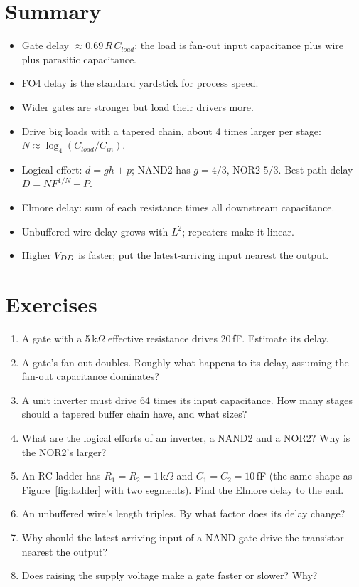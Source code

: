 \section{Summary}

\begin{itemize}
  \item Gate delay $\approx 0.69\,R\,C_{load}$; the load is fan-out input capacitance plus wire plus parasitic capacitance.
  \item FO4 delay is the standard yardstick for process speed.
  \item Wider gates are stronger but load their drivers more.
  \item Drive big loads with a tapered chain, about 4 times larger per stage: $N \approx \log_4(C_{load}/C_{in})$.
  \item Logical effort: $d = gh + p$; NAND2 has $g = 4/3$, NOR2 $5/3$. Best path delay $D = NF^{1/N} + P$.
  \item Elmore delay: sum of each resistance times all downstream capacitance.
  \item Unbuffered wire delay grows with $L^2$; repeaters make it linear.
  \item Higher $V_{DD}$ is faster; put the latest-arriving input nearest the output.
\end{itemize}

\section{Exercises}

\begin{enumerate}
  \item A gate with a 5\,k$\Omega$ effective resistance drives 20\,fF. Estimate its delay.
  \item A gate's fan-out doubles. Roughly what happens to its delay, assuming the fan-out capacitance dominates?
  \item A unit inverter must drive 64 times its input capacitance. How many stages should a tapered buffer chain have, and what sizes?
  \item What are the logical efforts of an inverter, a NAND2 and a NOR2? Why is the NOR2's larger?
  \item An RC ladder has $R_1 = R_2 = 1$\,k$\Omega$ and $C_1 = C_2 = 10$\,fF (the same shape as Figure~\ref{fig:ladder} with two segments). Find the Elmore delay to the end.
  \item An unbuffered wire's length triples. By what factor does its delay change?
  \item Why should the latest-arriving input of a NAND gate drive the transistor nearest the output?
  \item Does raising the supply voltage make a gate faster or slower? Why?
\end{enumerate}

